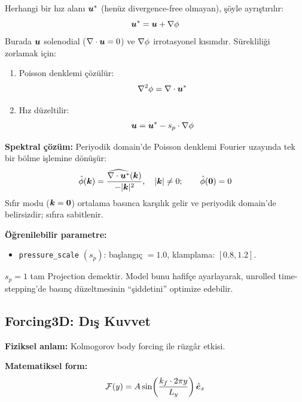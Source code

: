 Herhangi bir hız alanı $\bm{u}^*$ (henüz divergence-free olmayan), şöyle ayrıştırılır:
\begin{equation}
    \bm{u}^* = \bm{u} + \nabla \phi
    \label{eq:helmholtz}
\end{equation}
Burada $\bm{u}$ solenodial ($\nabla \cdot \bm{u} = 0$) ve $\nabla \phi$ irrotasyonel kısımdır. Sürekliliği zorlamak için:
\begin{enumerate}
    \item Poisson denklemi çözülür:
    \begin{equation}
        \nabla^2 \phi = \nabla \cdot \bm{u}^*
        \label{eq:poisson}
    \end{equation}
    \item Hız düzeltilir:
    \begin{equation}
        \bm{u} = \bm{u}^* - s_p \cdot \nabla \phi
        \label{eq:projection_correction}
    \end{equation}
\end{enumerate}

\textbf{Spektral çözüm:} Periyodik domain'de Poisson denklemi Fourier uzayında tek bir bölme işlemine dönüşür:
\begin{equation}
    \hat{\phi}(\bm{k}) = \frac{\widehat{\nabla \cdot \bm{u}^*}(\bm{k})}{-|\bm{k}|^2}, \quad |\bm{k}| \neq 0; \qquad \hat{\phi}(\bm{0}) = 0
    \label{eq:poisson_spectral}
\end{equation}
Sıfır modu ($\bm{k} = \bm{0}$) ortalama basınca karşılık gelir ve periyodik domain'de belirsizdir; sıfıra sabitlenir.

\textbf{Öğrenilebilir parametre:}
\begin{itemize}
    \item \texttt{pressure\_scale} $(s_p)$: başlangıç $= 1.0$, klamplama: $[0.8, 1.2]$.
\end{itemize}
$s_p = 1$ tam Projection demektir. Model bunu hafifçe ayarlayarak, unrolled time-stepping'de basınç düzeltmesinin ``şiddetini'' optimize edebilir.


\subsection{Forcing3D: Dış Kuvvet}
\label{sec:forcing_noron}

\textbf{Fiziksel anlam:} Kolmogorov body forcing ile rüzgâr etkisi.

\textbf{Matematiksel form:}
\begin{equation}
    \mathcal{F}(y) = A \sin\!\left(\frac{k_f \cdot 2\pi y}{L_y}\right) \hat{\bm{e}}_x
    \label{eq:forcing_neuron}
\end{equation}

